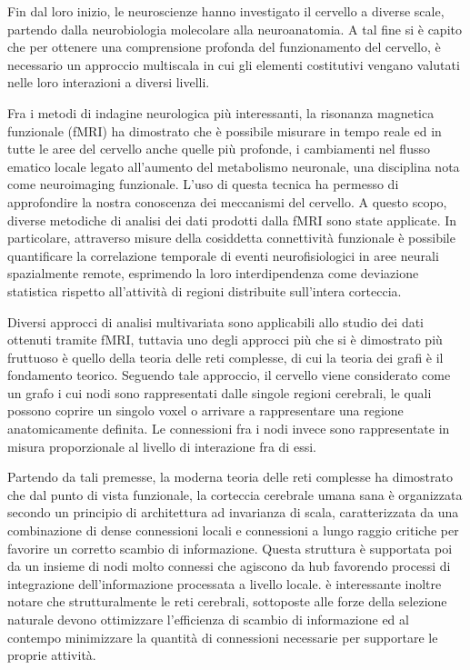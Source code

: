 Fin dal loro inizio, le neuroscienze hanno investigato il cervello a diverse scale, partendo dalla neurobiologia molecolare alla neuroanatomia.
A tal fine si è capito che per ottenere una comprensione profonda del funzionamento del cervello, è necessario un approccio multiscala in cui gli elementi costitutivi vengano valutati nelle loro interazioni a diversi livelli.

Fra i metodi di indagine neurologica più interessanti, la risonanza magnetica funzionale (fMRI) ha dimostrato che è possibile misurare in tempo reale ed in tutte le aree del cervello anche quelle più profonde, i cambiamenti nel flusso ematico locale legato all'aumento del metabolismo neuronale, una disciplina nota come neuroimaging funzionale.
L'uso di questa tecnica ha permesso di approfondire la nostra conoscenza dei meccanismi del cervello.
A questo scopo, diverse metodiche di analisi dei dati prodotti dalla fMRI sono state applicate.
In particolare, attraverso misure della cosiddetta connettività funzionale è possibile quantificare la correlazione temporale di eventi neurofisiologici in aree neurali spazialmente remote, esprimendo la loro interdipendenza come deviazione statistica rispetto all'attività di regioni distribuite sull'intera corteccia.

Diversi approcci di analisi multivariata sono applicabili allo studio dei dati ottenuti tramite fMRI, tuttavia uno degli approcci più che si è dimostrato più fruttuoso è quello della teoria delle reti complesse, di cui la teoria dei grafi è il fondamento teorico.
Seguendo tale approccio, il cervello viene considerato come un grafo i cui nodi sono rappresentati dalle singole regioni cerebrali, le quali possono coprire un singolo voxel o arrivare a rappresentare una regione anatomicamente definita.
Le connessioni fra i nodi invece sono rappresentate in misura proporzionale al livello di interazione fra di essi.

Partendo da tali premesse, la moderna teoria delle reti complesse ha dimostrato che dal punto di vista funzionale, la corteccia cerebrale umana sana 
è organizzata secondo un principio di architettura ad invarianza di scala, caratterizzata da una combinazione di dense connessioni locali e connessioni a lungo raggio critiche per favorire un corretto scambio di informazione. Questa struttura è supportata poi da un insieme di nodi molto connessi che agiscono da hub favorendo processi di integrazione dell'informazione processata a livello locale.
è interessante inoltre notare che strutturalmente le reti cerebrali, sottoposte alle forze della selezione naturale devono ottimizzare l'efficienza di scambio di informazione ed al contempo minimizzare la quantità di connessioni necessarie per supportare le proprie attività.

